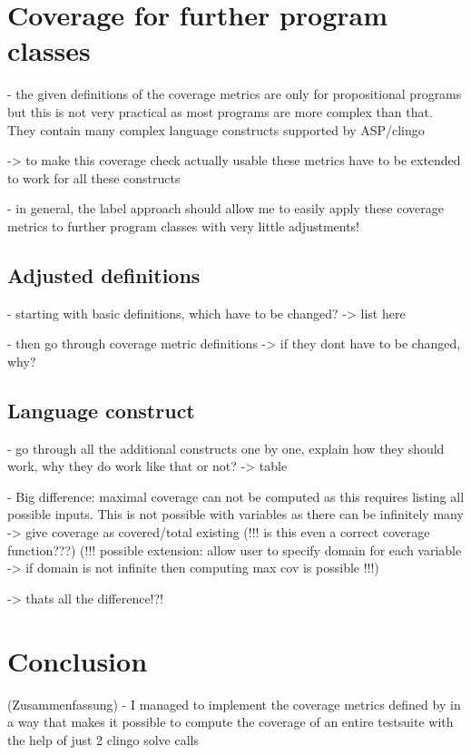 \chapter{Coverage for further program classes}
\label{ch:Coverage for further program classes}
- the given definitions of the coverage metrics are only for propositional programs but this is not very practical as most programs 
are more complex than that. They contain many complex language constructs supported by ASP/clingo

-> to make this coverage check actually usable these metrics have to be extended to work for all these constructs

- in general, the label approach should allow me to easily apply these coverage metrics to further program classes with very little 
adjustments!

\section{Adjusted definitions}
\label{sec:Coverage for further program classes/Adjusted definitions}
- starting with basic definitions, which have to be changed? -> list here

- then go through coverage metric definitions -> if they dont have to be changed, why?

\section{Language construct}
\label{sec:Coverage for further program classes/Language constructs}
- go through all the additional constructs one by one, explain how they should work, why they do work like that or not?
-> table

- Big difference: maximal coverage can not be computed as this requires listing all possible inputs. This is not possible with variables 
as there can be infinitely many -> give coverage as covered/total existing (!!! is this even a correct coverage function???)
(!!! possible extension: allow user to specify domain for each variable -> if domain is not infinite then computing max cov is possible !!!) 

-> thats all the difference!?!

\chapter{Conclusion}
\label{ch:Conclusion}
(Zusammenfassung)
- I managed to implement the coverage metrics defined by \textcite{Jan+10} in a way that makes it possible to compute the coverage 
of an entire testsuite with the help of just 2 clingo solve calls

